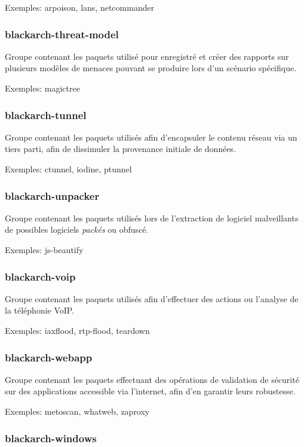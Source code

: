 \documentclass[a4paper, oneside, 11pt]{book}
\begin{document}
Exemples: arpoison, lans, netcommander

\subsubsection{blackarch-threat-model}

Groupe contenant les paquets utilisé pour enregistré et créer des rapports sur
plusieurs modèles de menaces pouvant se produire lors d'un scénario spécifique.

Exemples: magictree

\subsubsection{blackarch-tunnel}

Groupe contenant les paquets utilisés afin d'encapsuler le contenu réseau via un
tiers parti, afin de dissimuler la provenance initiale de données. 

Exemples: ctunnel, iodine, ptunnel

\subsubsection{blackarch-unpacker}

Groupe contenant les paquets utilisés lors de l'extraction de logiciel
malveillants de possibles logiciels \textit{packés} ou obfuscé.

Exemples: js-beautify

\subsubsection{blackarch-voip}

Groupe contenant les paquets utilisés afin d'effectuer des actions ou l'analyse
de la téléphonie VoIP.

Exemples: iaxflood, rtp-flood, teardown

\subsubsection{blackarch-webapp}

Groupe contenant les paquets effectuant des opérations de validation de sécurité
sur des applications accessible via l'internet, afin d'en garantir leurs 
robustesse. 

Exemples: metoscan, whatweb, zaproxy

\subsubsection{blackarch-windows}
\end{document}
